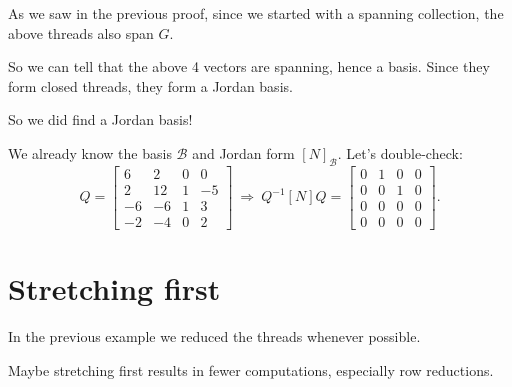 \documentclass[12pt]{article}
\newcommand{\1}{\mathbf{1}}
\newcommand{\0}{\mathbf{0}}
\newcommand{\B}{\mathcal{B}}
\theoremstyle{definition}
\begin{document}
As we saw in the previous proof, since we started with a spanning collection, the above threads also span $G$.

So we can tell that the above 4 vectors are spanning, hence a basis. Since they form closed threads, they form a Jordan basis.

So we did find a Jordan basis!

We already know the basis $ \B $ and Jordan form $ [N]_\B $.
Let's double-check:
\[
Q=
\left[\begin{matrix}6 & 2 & 0 & 0\\2 & 12 & 1 & -5\\-6 & -6 & 1 & 3\\-2 & -4 & 0 & 2\end{matrix}\right]
\
\Longrightarrow
\
Q^{-1} [N] Q = 
\left[\begin{array}{rrr|r} 0 & 1 & 0 & 0\\0 & 0 & 1 & 0\\0 & 0 & 0 & 0 \\ \hline 0 & 0 & 0 & 0\end{array}\right]
.
\]

\section{Stretching first}

In the previous example we reduced the threads whenever possible.

Maybe stretching first results in fewer computations, especially row reductions.
\end{document}
